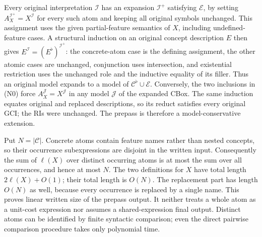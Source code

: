 Every original interpretation \(\mathcal I\) has an expansion
\(\mathcal I^+\) satisfying \(\mathcal E\), by setting
\(A_X^{\mathcal I^+}=X^{\mathcal I}\) for every such atom and keeping all
original symbols unchanged.  This assignment uses the given partial-feature
semantics of \(X\), including undefined-feature cases.
A structural induction on an original concept description \(E\) then gives
\(E^{\mathcal I}=(E^\flat)^{\mathcal I^+}\): the concrete-atom case is
the defining assignment, the other atomic cases are unchanged, conjunction
uses intersection, and existential restriction uses the unchanged role and
the inductive equality of its filler.
Thus an original model expands to a model of
\(\mathcal C^\flat\cup\mathcal E\).
Conversely, the two inclusions in (N0) force
\(A_X^{\mathcal J}=X^{\mathcal J}\) in any model \(\mathcal J\)
of the expanded CBox.  The same induction equates original and replaced
descriptions, so its reduct satisfies every original GCI; the RIs were
unchanged.  The prepass is therefore a model-conservative extension.

Put \(N=|\mathcal C|\).
Concrete atoms contain feature names rather than nested concepts, so their
occurrence subexpressions are disjoint in the written input.
Consequently the sum of \(\ell(X)\) over distinct occurring atoms is at
most the sum over all occurrences, and hence at most \(N\).
The two definitions for \(X\) have total length
\(2\ell(X)+O(1)\); their total length is \(O(N)\).
The replacement part has length \(O(N)\) as well, because every occurrence
is replaced by a single name.  This proves linear written size of the
prepass output.  It neither treats a whole atom as a unit-cost expression
nor assumes a shared-expression final output.
Distinct atoms can be identified by finite syntactic comparison; even the
direct pairwise comparison procedure takes only polynomial time.

